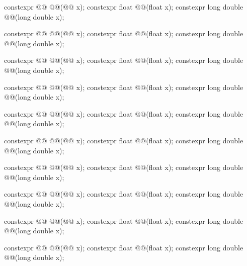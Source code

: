 \begin{codeblock}
{  constexpr @@ @@(@@ x);
  constexpr float               @@(float x);
  constexpr long double         @@(long double x);

  constexpr @@ @@(@@ x);
  constexpr float               @@(float x);
  constexpr long double         @@(long double x);

  constexpr @@ @@(@@ x);
  constexpr float               @@(float x);
  constexpr long double         @@(long double x);

  constexpr @@ @@(@@ x);
  constexpr float               @@(float x);
  constexpr long double         @@(long double x);

  constexpr @@ @@(@@ x);
  constexpr float               @@(float x);
  constexpr long double         @@(long double x);

  constexpr @@ @@(@@ x);
  constexpr float               @@(float x);
  constexpr long double         @@(long double x);

  constexpr @@ @@(@@ x);
  constexpr float               @@(float x);
  constexpr long double         @@(long double x);

  constexpr @@ @@(@@ x);
  constexpr float               @@(float x);
  constexpr long double         @@(long double x);

  constexpr @@ @@(@@ x);
  constexpr float               @@(float x);
  constexpr long double         @@(long double x);

  constexpr @@ @@(@@ x);
  constexpr float               @@(float x);
  constexpr long double         @@(long double x);

}
\end{codeblock}
